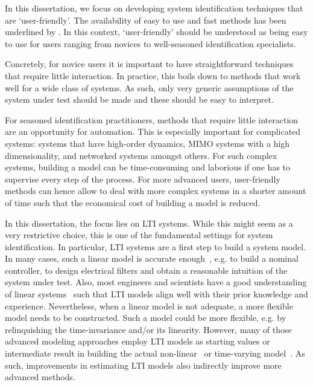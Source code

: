 In this dissertation, we focus on developing system identification techniques that are `user-friendly'.
The availability of easy to use and fast methods has been underlined by \citet{Gevers2011Challenges}.
In this context, `user-friendly' should be understood as being easy to use for users ranging from novices to well-seasoned identification specialists.

Concretely, for novice users it is important to have straightforward techniques that require little interaction.
In practice, this boils down to methods that work well for a wide class of systems.
As such, only very generic assumptions of the system under test should be made and these should be easy to interpret.

For seasoned identification practitioners, methods that require little interaction are an opportunity for automation.
This is especially important for complicated systems: systems that have high-order dynamics, \gls{MIMO} systems with a high dimensionality, and networked systems amongst others.
For such complex systems, building a model can be time-consuming and laborious if one has to supervise every step of the process.
For more advanced users, user-friendly methods can hence allow to deal with more complex systems in a shorter amount of time such that the economical cost of building a model is reduced.

In this dissertation, the focus lies on \gls{LTI} systems.
While this might seem as a very restrictive choice, this is one of the fundamental settings for system identification.
In particular, \gls{LTI} systems are a first step to build a system model.
In many cases, such a linear model is accurate enough~\citep{Schoukens2004}, e.g. to build a nominal controller, to design electrical filters and obtain a reasonable intuition of the system under test.
Also, most engineers and scientists have a good understanding of linear systems~\citep{Oppenheim1996,Mandal2007,Kailath1980} such that \gls{LTI} models align well with their prior knowledge and experience.
Nevertheless, when a linear model is not adequate, a more flexible model needs to be constructed.
Such a model could be more flexible, e.g. by relinquishing the time-invariance and/or its linearity.
However, many of those advanced modeling approaches employ \gls{LTI} models as starting values or intermediate result in building the actual non-linear~\citep{Giri2010} or time-varying model~\citep{Lataire2012,Louarroudi2014}.
As such, improvements in estimating \gls{LTI} models also indirectly improve more advanced methods.

